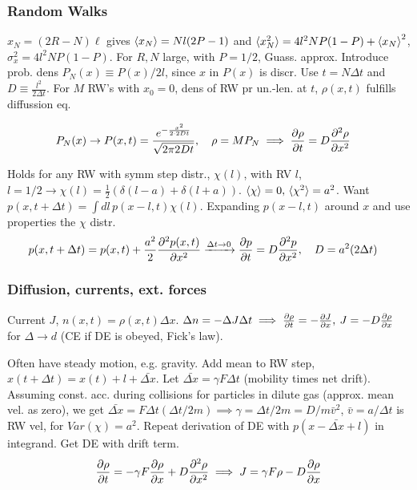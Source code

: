 \documentclass[a4paper, english, 12pt]{article}
\begin{document}
\begin{multicols*}{2}
\subsubsection*{\scriptsize Random Walks}

$x_N=(2R-N)\ell$ gives $\expval{x_N}=Nl(2P-1)$ and $\langle x_N^2\rangle=4l^2 NP(1-P) + \expval{x_N}^2$, $\sigma_x^2 = 4l^2 N P(1-P)$. For $R,N$ large, with $P=1/2$, Guass. approx. Introduce prob. dens $P_N(x)\equiv P(x)/2l$, since $x$ in $P(x)$ is discr. Use $t=N\Delta t$ and $D\equiv \frac{l^2}{2\Delta t}$. For $M$ RW's with $x_0=0$, dens of RW pr un.-len. at $t$, $\rho(x,t)$ fulfills diffussion eq.  

\begin{align*}
    P_N(x)\to P(x,t) &= \frac{e^{-\frac{x^2}{2\cdot 2Dt}}}{\sqrt{2\pi 2Dt}},\quad \rho = M P_N \implies \pdv{\rho}{t} = D \pdv[2]{\rho}{x}
\end{align*}

Holds for any RW with symm step distr., $\chi(l)$, with RV $l$, $l=1/2\to\chi(l)=\frac{1}{2}(\delta(l-a) + \delta(l+a))$. $\expval{\chi}=0,\,\langle\chi^2\rangle=a^2$. Want $p(x,t+\Delta t)=\int dl\,p(x-l,t)\chi(l)$. Expanding $p(x-l,t)$ around $x$ and use properties the $\chi$ distr. 
\begin{align*}
    p(x,t+\Delta t) &= p(x,t) + \frac{a^2}{2}\pdv[2]{p(x,t)}{x} \xrightarrow{\Delta t\to0} \pdv{p}{t}=D \pdv[2]{p}{x},\quad D=a^2(2\Delta t)
\end{align*}

\subsubsection*{\scriptsize Diffusion, currents, ext. forces}
Current $J$, $n(x,t)=\rho(x,t)\Delta x$. $\Delta n=-\Delta J \Delta t \implies \pdv{\rho}{t} = - \pdv{J}{x},\: J = -D\pdv{\rho}{x}$ for $\Delta\to d$ (CE if DE is obeyed, Fick's law).

Often have steady motion, e.g. gravity. Add mean to RW step, $x(t+\Delta t)=x(t)+l+\bar{\Delta x}$. Let $\bar{\Delta x} = \gamma F\Delta t$ (mobility times net drift). Assuming const. acc. during collisions for particles in dilute gas (approx. mean vel. as zero), we get $\bar{\Delta x}=F\Delta t (\Delta t/2m)\implies \gamma = \Delta t/2m=D/m\bar{v}^2$,\: $\bar{v}=a/\Delta t$ is RW vel, for $Var(\chi)=a^2$. Repeat derivation of DE with $p(x-\bar{\Delta x}+l)$ in integrand. Get DE with drift term.
\begin{align*}
    \pdv{\rho}{t} = -\gamma F \pdv{\rho}{x} + D\pdv[2]{\rho}{x} \implies J = \gamma F \rho - D \pdv{\rho}{x}
\end{align*}


\end{multicols*}
\end{document}
